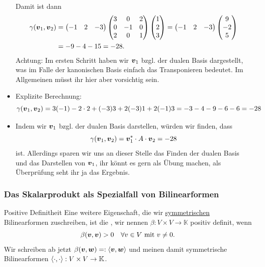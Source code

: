 \begin{Beispiel}
\begin{itemize}
\begin{equation*}
    \end{equation*}
    Damit ist dann
    \begin{align*}
        \gamma({{\text{\boldmath${v}$}}}_1,{{\text{\boldmath${v}$}}}_2)&=\begin{pmatrix}-1&2&-3\end{pmatrix}\begin{pmatrix}3&0&2\\0&-1&0\\2&0&1\end{pmatrix}\begin{pmatrix}1\\2\\3\end{pmatrix}=\begin{pmatrix}-1&2&-3\end{pmatrix}\begin{pmatrix}9\\-2\\5\end{pmatrix}\\
        &=-9-4-15=-28.
    \end{align*}
    Achtung: Im ersten Schritt haben wir ${{\text{\boldmath${v}$}}}_1$ bzgl. der dualen Basis dargestellt, was im Falle der kanonischen Basis einfach das Transponieren bedeutet. Im Allgemeinen müsst ihr hier aber vorsichtig sein.
    \item Explizite Berechnung:
    \begin{equation*}
        \gamma({{\text{\boldmath${v}$}}}_1,{{\text{\boldmath${v}$}}}_2)=3(-1)-2\cdot 2+(-3)3+2(-3)1+2(-1)3=-3-4-9-6-6=-28
    \end{equation*}
    \item Indem wir ${{\text{\boldmath${v}$}}}_1$ bzgl. der dualen Basis darstellen, würden wir finden, dass
    \begin{equation*}
        \gamma({{\text{\boldmath${v}$}}}_1,{{\text{\boldmath${v}$}}}_2)={{\text{\boldmath${v}$}}}_1^*\cdot A\cdot {{\text{\boldmath${v}$}}}_2=-28
    \end{equation*}
    ist. Allerdings sparen wir uns an dieser Stelle das Finden der dualen Basis und das Darstellen von ${{\text{\boldmath${v}$}}}_1$, ihr könnt es gern als Übung machen, als Überprüfung seht ihr ja das Ergebnis.
\end{itemize}
\end{Beispiel}

\subsubsection{Das Skalarprodukt als Spezialfall von Bilinearformen}
\begin{Def}
{Positive Definitheit}
Eine weitere Eigenschaft, die wir \underline{symmetrischen} Bilinearformen zuschreiben, ist die , wir nennen $\beta:V\times V\to \mathbb{K}$ positiv definit, wenn
\begin{equation}
    \beta({{\text{\boldmath${v}$}}},{{\text{\boldmath${v}$}}})>0 \quad \forall v\in V\text{ mit } v\neq0.
\end{equation}
Wir schreiben ab jetzt $\beta({{\text{\boldmath${v}$}}},{{\text{\boldmath${w}$}}})=:\left\langle{{\text{\boldmath${v}$}}},{{\text{\boldmath${w}$}}}\right\rangle$ und meinen damit symmetrische Bilinearformen $\left\langle\cdot,\cdot\right\rangle:V\times V\to \mathbb{K}$.
\end{Def}

